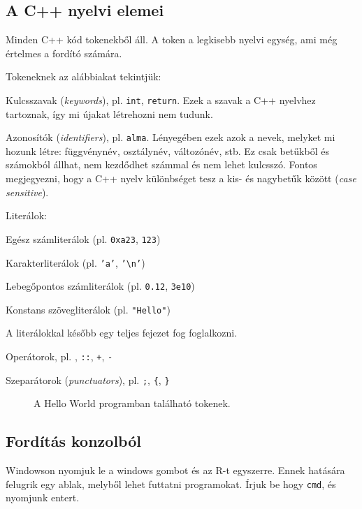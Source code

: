 \documentclass[../cpp_book/cpp_book.tex]{subfiles}
\begin{document}
	\subsection{A C++ nyelvi elemei}
	Minden C++ kód tokenekből áll. A token a legkisebb nyelvi egység, ami még értelmes a fordító számára. %
	
	Tokeneknek az alábbiakat tekintjük:
	\begin{compactitem}
		\item Kulcsszavak (\textit{keywords}), pl. \texttt{int}, \texttt{return}. Ezek a szavak a C++ nyelvhez tartoznak, így mi újakat létrehozni nem tudunk.
		\item Azonosítók (\textit{identifiers}), pl. \texttt{alma}. Lényegében ezek azok a nevek, melyket mi hozunk létre: függvénynév, osztálynév, változónév, stb. Ez csak betűkből és számokból állhat, nem kezdődhet számmal és nem lehet kulcsszó. Fontos megjegyezni, hogy a C++ nyelv különbséget tesz a kis- és nagybetűk között (\textit{case sensitive}).
 		\item Literálok:
		\begin{compactitem}
			\item Egész számliterálok (pl. \texttt{0xa23}, \texttt{123})
			\item Karakterliterálok (pl. \texttt{'a'}, \texttt{'\textbackslash n'})
			\item Lebegőpontos számliterálok (pl. \texttt{0.12}, \texttt{3e10})
			\item Konstans szövegliterálok (pl. \texttt{"Hello"})
		\end{compactitem}
		A literálokkal később egy teljes fejezet fog foglalkozni.
		\item Operátorok, pl. \texttt{\<}, \texttt{::}, \texttt{+}, \texttt{-}
		\item Szeparátorok (\textit{punctuators}), pl. \texttt{;}, \texttt{\{}, \texttt{\}}
	\end{compactitem}
	\begin{figure}[!h]
		\centering
		
		\caption{A Hello World programban található tokenek.}\label{fig_tokens}
	\end{figure}
	\subsection{Fordítás konzolból}
	Windowson nyomjuk le a windows gombot és az R-t egyszerre. Ennek hatására felugrik egy ablak, melyből lehet futtatni programokat. Írjuk be hogy \texttt{cmd}, és nyomjunk entert. 
	
\end{document}
